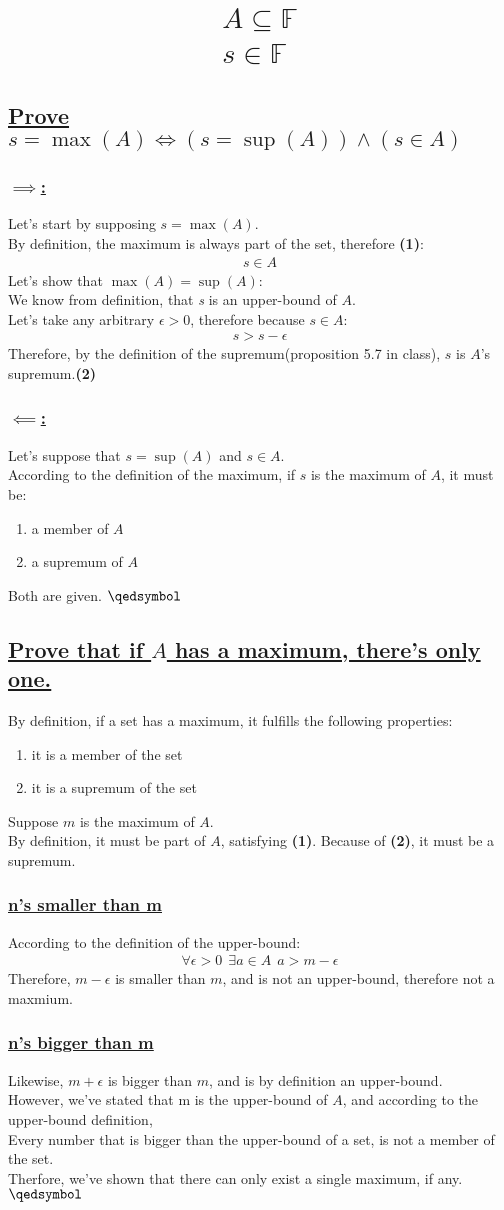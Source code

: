 \documentclass[a4paper, 12pt]{article}
\newcommand{\sub}[1]{\subsection{\underline{#1}}}
\newcommand{\subsub}[1]{\subsubsection{\underline{#1}}}
\newcommand{\F}{\ensuremath{\mathbb{F}}}
\newcommand{\eq}[1]{\begin{align*}#1\end{align*}}
\renewcommand{\qed}{\hfill\(\qedsymbol\)}
\begin{document}
\section{\eq{A\subseteq\F\\s\in\F}}
\sub{Prove $s=\max(A) \iff (s=\sup(A)) \land (s\in{A})$}
\subsub{$\implies$:}
Let's start by supposing $s=\max(A)$.\\
By definition, the maximum is always part of the set, therefore \textbf{(1)}: \eq{s\in{A}}
Let's show that $\max(A)=\sup(A)$:\\
We know from definition, that \textit{s} is an upper-bound of $A$.\\
Let's take any arbitrary $\epsilon>0$, therefore because $s\in{A}$:
\eq{s>s-\epsilon}
Therefore, by the definition of the supremum(proposition 5.7 in class), $s$ is $A$'s supremum.\textbf{(2)}
\subsub{$\impliedby$:}
Let's suppose that $s=\sup(A)$ and $s\in{A}$.\\
According to the definition of the maximum, if $s$ is the maximum of $A$, it must be:
\begin{enumerate}
    \item a member of $A$
    \item a supremum of $A$
\end{enumerate}
Both are given.
\qed
\sub{Prove that if $A$ has a maximum, there's only one.}
By definition, if a set has a maximum, it fulfills the following properties:
\begin{enumerate}
    \item it is a member of the set
    \item it is a supremum of the set
\end{enumerate}
Suppose $m$ is the maximum of $A$.\\
By definition, it must be part of $A$, satisfying \textbf{(1)}.
Because of \textbf{(2)}, it must be a supremum.
\subsub{n's smaller than m}
According to the definition of the upper-bound: \eq{\forall{\epsilon}>0~~\exists{a}\in{A}~~a>m-\epsilon}
Therefore, $m-\epsilon$ is smaller than $m$, and is not an upper-bound, therefore not a maxmium.
\subsub{n's bigger than m}
Likewise, $m+\epsilon$ is bigger than $m$, and is by definition an upper-bound.\\
However, we've stated that m is the upper-bound of $A$, and according to the upper-bound definition,\\
Every number that is bigger than the upper-bound of a set, is not a member of the set.\\
Therfore, we've shown that there can only exist a single maximum, if any.
\qed
\end{document}

